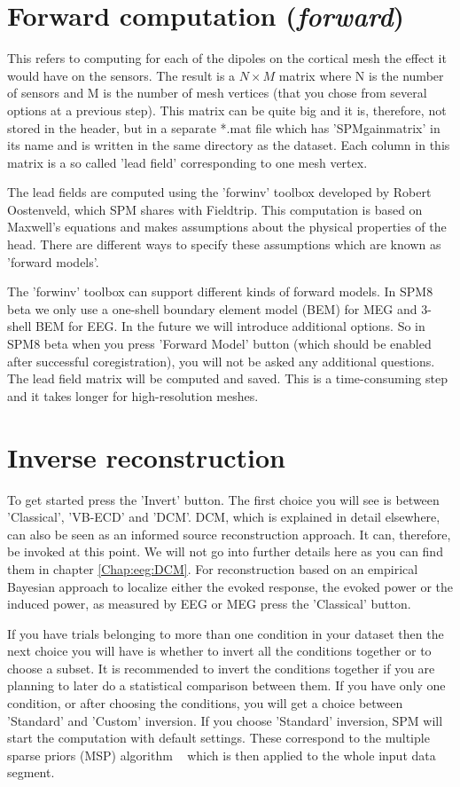 \section{Forward computation (\textit{forward})}
This refers to computing for each of the dipoles on the cortical mesh the effect it would have on the sensors. The result
is a $N \times M$ matrix where N is the number of sensors and M is the number of mesh vertices (that you chose from several options
at a previous step). This matrix can be quite big and it is, therefore, not stored in the header, but in a separate *.mat file which has
'SPMgainmatrix' in its name and is written in the same directory as the dataset. Each column in this matrix is a so called 'lead field'
corresponding to one mesh vertex. 

The lead fields are computed using the 'forwinv' toolbox developed by Robert Oostenveld, which
SPM shares with Fieldtrip. This computation is based on Maxwell's equations and makes assumptions about the physical properties of the head.
There are different ways to specify these assumptions which are known as 'forward models'. 

The 'forwinv' toolbox can support different kinds of forward
models. In SPM8 beta we only use a one-shell boundary element model (BEM) for MEG and 3-shell BEM for EEG. In the future we will introduce additional
options. So in SPM8 beta when you press 'Forward Model' button (which should be enabled after successful coregistration), you will not be asked
any additional questions. The lead field matrix will be computed and saved. This is a time-consuming step and it takes longer for high-resolution
meshes.


\section{Inverse reconstruction}
To get started press the 'Invert' button. The first
choice you will see is between 'Classical', 'VB-ECD' and 'DCM'. DCM, which is explained in detail elsewhere, can also be seen as an
informed source reconstruction approach. It can, therefore, be invoked at this point. We will not go into further details here as you
can find them in chapter \ref{Chap:eeg:DCM}. For reconstruction based on an empirical Bayesian approach to localize either the evoked response,
the evoked power or the induced power, as measured by EEG or MEG press the 'Classical' button. 

If you have trials belonging to more than one condition
in your dataset then the next choice you will have is whether to invert all the conditions together or to choose a subset. It is recommended to invert
the conditions together if you are planning to later do a statistical comparison between them. If you have only one condition, or after choosing
the conditions, you will get a choice between 'Standard' and 'Custom' inversion. If you choose 'Standard' inversion, SPM will start the computation
with default settings. These correspond to the multiple sparse priors (MSP) algorithm ~\cite{karl_msp} which is then applied to the whole input data segment.

